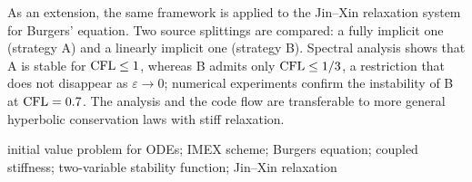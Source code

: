 As an extension, the same framework is applied to the Jin--Xin relaxation system for Burgers' equation. Two source splittings are compared: a fully implicit one (strategy A) and a linearly implicit one (strategy B). Spectral analysis shows that A is stable for $\mathrm{CFL}\le 1$, whereas B admits only $\mathrm{CFL}\le 1/3$, a restriction that does not disappear as $\varepsilon\to0$; numerical experiments confirm the instability of B at $\mathrm{CFL}=0.7$. The analysis and the code flow are transferable to more general hyperbolic conservation laws with stiff relaxation.

\vspace{1.2em}
 initial value problem for ODEs; IMEX scheme; Burgers equation; coupled stiffness; two-variable stability function; Jin--Xin relaxation
\endgroup
